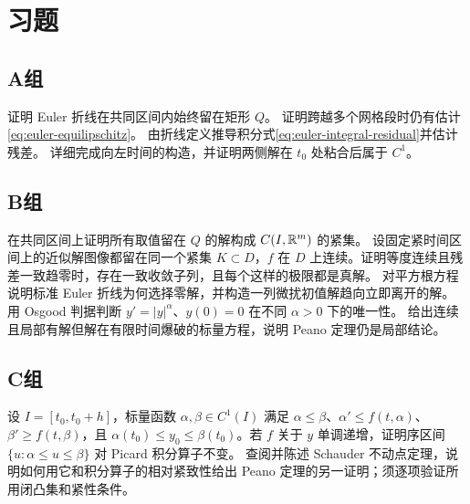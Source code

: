 \section*{习题}
\subsection*{A组}
\begin{enumerate}[label=\textbf{\thechapter.\arabic*.}]
证明 Euler 折线在共同区间内始终留在矩形 \(Q\)。
证明跨越多个网格段时仍有估计\eqref{eq:euler-equilipschitz}。
由折线定义推导积分式\eqref{eq:euler-integral-residual}并估计残差。
详细完成向左时间的构造，并证明两侧解在 \(t_0\) 处粘合后属于 \(C^1\)。
\end{enumerate}
\subsection*{B组}
\begin{enumerate}[label=\textbf{\thechapter.\arabic*.},resume]
在共同区间上证明所有取值留在 \(Q\) 的解构成 \(C(I,\mathbb{R}^m)\) 的紧集。
设固定紧时间区间上的近似解图像都留在同一个紧集 \(K\subset D\)，\(f\) 在 \(D\) 上连续。证明等度连续且残差一致趋零时，存在一致收敛子列，且每个这样的极限都是真解。
对平方根方程说明标准 Euler 折线为何选择零解，并构造一列微扰初值解趋向立即离开的解。
用 Osgood 判据判断 \(y'=|y|^\alpha\)、\(y(0)=0\) 在不同 \(\alpha>0\) 下的唯一性。
给出连续且局部有解但解在有限时间爆破的标量方程，说明 Peano 定理仍是局部结论。
\end{enumerate}
\subsection*{C组}
\begin{enumerate}[label=\textbf{\thechapter.\arabic*.},resume]
设 \(I=[t_0,t_0+h]\)，标量函数 \(\alpha,\beta\in C^1(I)\) 满足 \(\alpha\le\beta\)、\(\alpha'\le f(t,\alpha)\)、\(\beta'\ge f(t,\beta)\)，且 \(\alpha(t_0)\le y_0\le\beta(t_0)\)。若 \(f\) 关于 \(y\) 单调递增，证明序区间 \(\{u:\alpha\le u\le\beta\}\) 对 Picard 积分算子不变。
查阅并陈述 Schauder 不动点定理，说明如何用它和积分算子的相对紧致性给出 Peano 定理的另一证明；须逐项验证所用闭凸集和紧性条件。
\end{enumerate}
